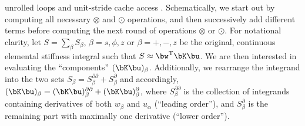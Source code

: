 unrolled loops and unit-stride cache access \citep{dfm}. 
Schematically, we start out by computing all necessary $\otimes$ and $\odot$ 
operations, and then successively add different terms before 
computing the next round of operations $\otimes$ or $\odot$. 
%
For notational clarity, let $S=\sum_\beta S_\beta$, $\beta=s,\phi,z$ 
or $\beta=+,-,z$ be the original, continuous elemental stiffness integral 
such that $S\approx\bw^{\rm{T}} \bK \bu$. We are then interested in evaluating 
the ``components'' $(\bK\bu)_\beta$. Additionally, we rearrange the integrand 
into the two sets
$S_\beta=S_{\beta}^{\partial\partial}+S_{\beta}^{\partial}$ and accordingly, 
$(\bK\bu)_\beta=(\bK\bu)_\beta^{\partial\partial}+(\bK\bu)_\beta^{\partial}$,
where $S_{\beta}^{\partial\partial}$ is the collection of integrands 
containing derivatives of both $w_\beta$ and $u_\alpha$ (``leading order''), 
and $S_{\beta}^{\partial}$ is the remaining part with maximally one derivative
 (``lower order'').
%
%
